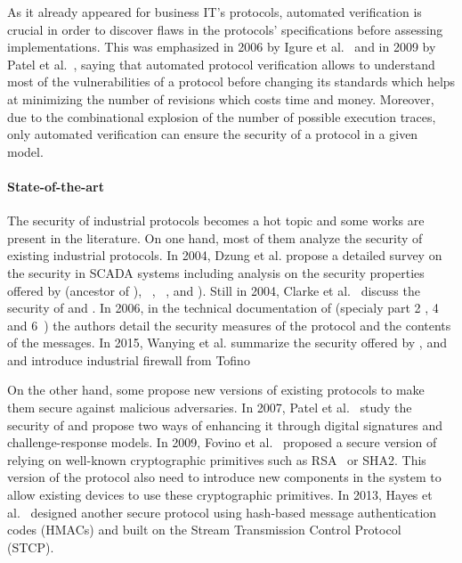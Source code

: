 As it already appeared for business IT's protocols, automated verification is
crucial in order to discover flaws in the protocols' specifications before
assessing implementations.
This was emphasized in 2006 by Igure et al.~\cite{ILW06} and in 2009 by Patel et
al.~\cite{PBG09}, saying that automated protocol verification allows to
understand most of the vulnerabilities of a protocol before changing its
standards which helps at minimizing the number of revisions which costs time and
money.
Moreover, due to the combinational explosion of the number of possible execution
traces, only automated verification can ensure the security of a protocol in a
given model.

\paragraph{State-of-the-art}\label{sec:intro_sota}

The security of industrial protocols becomes a hot topic and some works are
present in the literature.
On one hand, most of them analyze the security of existing industrial protocols.
In 2004, Dzung et al. propose a detailed survey on the security in SCADA systems
including analysis on the security properties offered by \opc (ancestor of
\opcua), \mms~\cite{ISO_MMS}, ~\cite{IEC_61850}, \iccp
\cite{IEC_60870} and \etherip).
Still in 2004, Clarke et al.~\cite{CR04} discuss the security of \dnp and
\iccp.
In 2006, in the technical documentation of \opcua (specialy part 2
\cite{opcua_part2}, 4~\cite{opcua_part4} and 6~\cite{opcua_part6}) the authors
detail the security measures of the protocol and the contents of the messages.
In 2015, Wanying et al. summarize the security offered by \modbus, \dnp and \opc
and introduce industrial firewall from Tofino~\cite{TOFINO}

On the other hand, some propose new versions of existing protocols to make them
secure against malicious adversaries.
In 2007, Patel et al.~\cite{PY07} study the security of \dnp and propose two
ways of enhancing it through digital signatures and challenge-response models.
In 2009, Fovino et al.~\cite{FCMT09} proposed a secure version of \modbus
relying on well-known cryptographic primitives such as RSA~\cite{RSA78} or SHA2.
This version of the protocol also need to introduce new components in the system
to allow existing devices to use these cryptographic primitives.
In 2013, Hayes et al.~\cite{HE13} designed another secure \modbus protocol using
hash-based message authentication codes (HMACs) and built on the Stream
Transmission Control Protocol~\cite{Ste07} (STCP).

